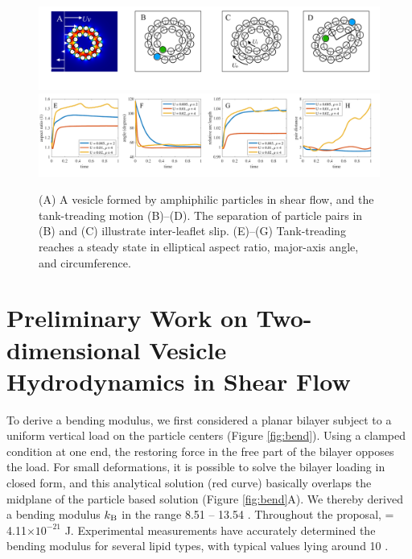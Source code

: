 \begin{figure}[!]
\begin{center}
\includegraphics[width=1\textwidth]{figures/PW_fig1A-D.pdf}
\includegraphics[width=1\textwidth]{figures/PW_fig1E-H.pdf}
\end{center}\vspace{-0.3in}
\caption{(A) A vesicle formed by amphiphilic particles in shear flow,
  and the tank-treading motion (B)--(D). The separation of particle
  pairs in (B) and (C) illustrate inter-leaflet slip.  (E)--(G)
  Tank-treading reaches a steady state in elliptical aspect ratio,
  major-axis angle, and circumference.}
\label{fig:tanktreading}
\end{figure}
\section{Preliminary Work on Two-dimensional Vesicle Hydrodynamics in Shear Flow\label{sec:preliminary_work}} 
To derive a bending modulus, we first considered a planar bilayer subject to a uniform vertical load on the particle centers (Figure \ref{fig:bend}). 
Using a clamped condition at one end, the restoring force in the free part of the bilayer opposes the load.
For small deformations, it is possible to solve the bilayer loading in closed form, and 
this analytical solution (red curve) basically overlaps the midplane of the particle based solution (Figure \ref{fig:bend}A).
We thereby derived a bending modulus $k_{\mathrm{B}}$ in the range 8.51 -- 13.54 \kBT. Throughout the proposal, \kBT\; = 4.11$\times 10^{-21}$ J.
Experimental measurements have accurately determined the bending modulus for several lipid types, with 
typical values lying around 10 \kBT\; \cite{Naetal15,VeBrPa15,NAGLE2000159,PhysRevLett.113.248102}.

